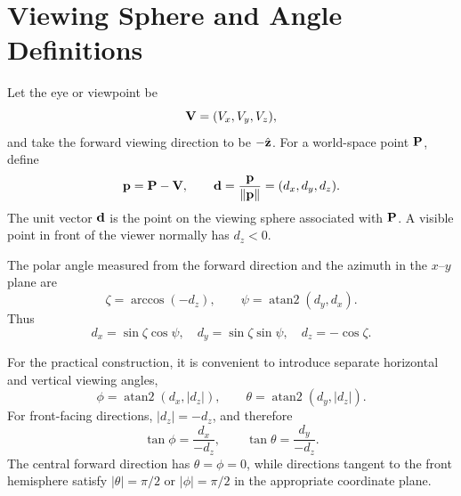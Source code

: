 \section{Viewing Sphere and Angle Definitions}
Let the eye or viewpoint be
\begin{equation}
  \vb V=(V_x,V_y,V_z),
\end{equation}
and take the forward viewing direction to be $-\hat{\vb z}$.  For a world-space point $\vb P$, define
\begin{equation}
  \vb p=\vb P-\vb V,
  \qquad
  \vb d=\frac{\vb p}{\lVert\vb p\rVert}
       =(d_x,d_y,d_z).
  \label{eq:viewing-direction}
\end{equation}
The unit vector $\vb d$ is the point on the viewing sphere associated with $\vb P$.  A visible point in front of the viewer normally has $d_z<0$.

The polar angle measured from the forward direction and the azimuth in the $x$--$y$ plane are
\begin{equation}
  \zeta=\arccos(-d_z),
  \qquad
  \psi=\operatorname{atan2}(d_y,d_x).
  \label{eq:polar-angles}
\end{equation}
Thus
\begin{equation}
  d_x=\sin\zeta\cos\psi,
  \quad
  d_y=\sin\zeta\sin\psi,
  \quad
  d_z=-\cos\zeta.
\end{equation}

For the practical construction, it is convenient to introduce separate horizontal and vertical viewing angles,
\begin{equation}
  \phi=\operatorname{atan2}(d_x,|d_z|),
  \qquad
  \theta=\operatorname{atan2}(d_y,|d_z|).
  \label{eq:theta-phi}
\end{equation}
For front-facing directions, $|d_z|=-d_z$, and therefore
\begin{equation}
  \tan\phi=\frac{d_x}{-d_z},
  \qquad
  \tan\theta=\frac{d_y}{-d_z}.
  \label{eq:tangent-angles}
\end{equation}
The central forward direction has $\theta=\phi=0$, while directions tangent to the front hemisphere satisfy $|\theta|=\pi/2$ or $|\phi|=\pi/2$ in the appropriate coordinate plane.

